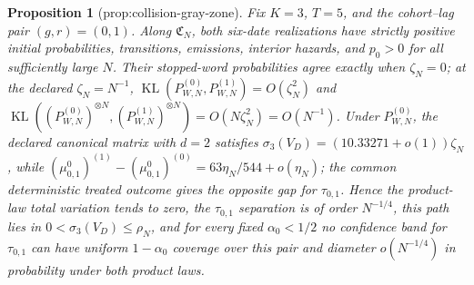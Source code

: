 \documentclass{article}
\newtheorem{proposition}{Proposition}
\begin{document}
\begin{proposition}[prop:collision-gray-zone]\label{prop:collision-gray-zone}
Fix \(K=3\), \(T=5\), and the cohort--lag pair \((g,r)=(0,1)\). Along \(\mathfrak C_N\), both six-date realizations have strictly positive initial probabilities, transitions, emissions, interior hazards, and \(p_0>0\) for all sufficiently large \(N\). Their stopped-word probabilities agree exactly when \(\zeta_N=0\); at the declared \(\zeta_N=N^{-1}\), \(\operatorname{KL}(P_{W,N}^{(0)},P_{W,N}^{(1)})=O(\zeta_N^2)\) and \(\operatorname{KL}((P_{W,N}^{(0)})^{\otimes N},(P_{W,N}^{(1)})^{\otimes N})=O(N\zeta_N^2)=O(N^{-1})\). Under \(P_{W,N}^{(0)}\), the declared canonical matrix with \(d=2\) satisfies \(\sigma_3(V_D)=(10.33271+o(1))\zeta_N\), while \((\mu^0_{0,1})^{(1)}-(\mu^0_{0,1})^{(0)}=63\eta_N/544+o(\eta_N)\); the common deterministic treated outcome gives the opposite gap for \(\tau_{0,1}\). Hence the product-law total variation tends to zero, the \(\tau_{0,1}\) separation is of order \(N^{-1/4}\), this path lies in \(0<\sigma_3(V_D)\le\rho_N\), and for every fixed \(\alpha_0<1/2\) no confidence band for \(\tau_{0,1}\) can have uniform \(1-\alpha_0\) coverage over this pair and diameter \(o(N^{-1/4})\) in probability under both product laws.
\end{proposition}
\end{document}
